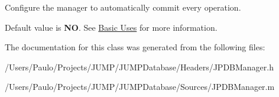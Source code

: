 Configure the manager to automatically commit every operation. 

Default value is {\bfseries NO}. See \hyperlink{basic_uses}{Basic Uses} for more information. 

The documentation for this class was generated from the following files:\begin{DoxyCompactItemize}
\item 
/Users/Paulo/Projects/JUMP/JUMPDatabase/Headers/JPDBManager.h\item 
/Users/Paulo/Projects/JUMP/JUMPDatabase/Sources/JPDBManager.m\end{DoxyCompactItemize}
